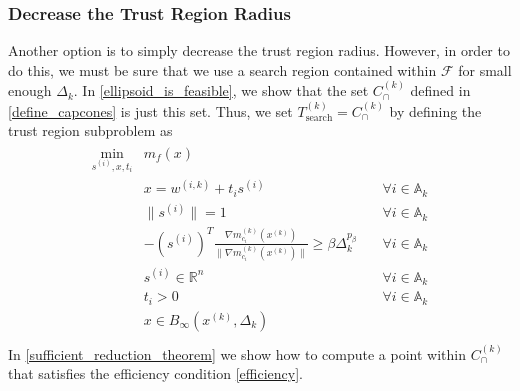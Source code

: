 \documentclass{article}
\newenvironment{comment}
  {\par\medskip
   \color{red}%
   \begin{framed}
   \textbf{Comment: }\ignorespaces}
 {\end{framed}
  \medskip}
\theoremstyle{case}
\numberwithin{theorem}{subsection}
\newcommand{\activeconstraintsk}{{\mathbb A_{k}}}
\newcommand{\capcones}{{C^{(k)}_{\cap}}}
\newcommand{\dk}{\Delta_k}
\newcommand{\feasible}{{\mathcal F}}
\newcommand{\hgik}{{\frac{\nabla m^{(k)}_{c_i}(\xk)}{\|\nabla m^{(k)}_{c_i}\left(\xk\right)\|}}}
\newcommand{\Rn}{\mathbb R^n}
\newcommand{\searchtrk}{{T_{\text{search}}^{(k)}}}
\newcommand{\tr}{{ B_{\infty}\left(\xk, \dk\right) }}
\newcommand{\wik}{{w^{(i, k)}}}
\newcommand{\xk}{x^{(k)}}
\begin{document}



\subsubsection{Decrease the Trust Region Radius}

Another option is to simply decrease the trust region radius.
However, in order to do this, we must be sure that we use a search region contained within $\feasible$ for small enough $\dk$.
In \cref{ellipsoid_is_feasible}, we show that the set $\capcones$ defined in \cref{define_capcones} is just this set.
Thus, we set $\searchtrk = \capcones$ by defining the trust region subproblem as
\begin{align}
\label{capcones_tr_subproblem}
\begin{array}{ccc}
\min_{s^{(i)},x,t_i} & m_f(x) & \\
 & x = \wik + t _i s^{(i)} & \quad \forall i \in \activeconstraintsk \\
 & \|s^{(i)}\| = 1 & \quad \forall i \in \activeconstraintsk \\
 & -\left(s^{(i)}\right)^T\hgik \ge \beta \dk^{p_{\beta}} & \quad \forall i \in \activeconstraintsk \\
 & s^{(i)} \in \Rn  & \quad \forall i \in \activeconstraintsk \\
 & t_i > 0          & \quad \forall i \in \activeconstraintsk \\
 & x \in \tr		& \\
\end{array}
\end{align}
In \cref{sufficient_reduction_theorem} we show how to compute a point within $\capcones$ that satisfies the efficiency condition \cref{efficiency}.


\end{document}
